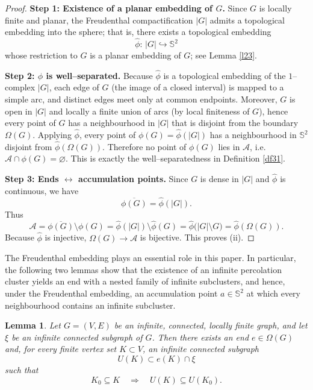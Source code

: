 \documentclass[11pt]{amsart}
\theoremstyle{plain}
\newtheorem{lemma}[theorem]{Lemma}
\numberwithin{equation}{section}
\numberwithin{figure}{section}
\begin{document}
\begin{proof}
\textbf{Step 1: Existence of a planar embedding of $G$.}
Since $G$ is locally finite and planar, the Freudenthal compactification $|G|$ admits a topological
embedding into the sphere; that is, there exists a topological embedding
\[
\widehat\phi:\,|G|\hookrightarrow \mathbb{S}^2
\]
whose restriction to $G$ is a planar embedding of $G$; see Lemma \ref{l23}.


\smallskip
\textbf{Step 2: $\phi$ is well--separated.}
Because $\widehat\phi$ is a topological embedding of the $1$--complex $|G|$, each edge of $G$
(the image of a closed interval) is mapped to a simple arc, and distinct edges meet only at common
endpoints. Moreover, $G$ is open in $|G|$ and locally a finite union of arcs (by local finiteness
of $G$), hence every point of $G$ has a neighbourhood in $|G|$ that is disjoint from the boundary
$\Omega(G)$. Applying $\widehat\phi$, every point of $\phi(G)=\widehat\phi(|G|)$ has a neighbourhood
in $\mathbb{S}^2$ disjoint from $\widehat\phi(\Omega(G))$. Therefore no point of $\phi(G)$ lies in
$\mathcal{A}$, i.e.\ $\mathcal{A}\cap\phi(G)=\varnothing$. This is exactly
the well--separatedness in Definition \ref{df31}.

\smallskip
\textbf{Step 3: Ends $\leftrightarrow$ accumulation points.}
Since $G$ is dense in $|G|$ and $\widehat\phi$ is continuous, we have
\[
\overline{\phi(G)}=\widehat\phi(|G|).
\]
Thus
\[
\mathcal{A}=\overline{\phi(G)}\setminus \phi(G)
=\widehat\phi(|G|)\setminus \widehat\phi(G)
=\widehat\phi\!\big(|G|\setminus G\big)
=\widehat\phi(\Omega(G)).
\]
Because $\widehat\phi$ is injective, $\Omega(G)\to \mathcal{A}$ is bijective. This proves (ii).
\end{proof}

The Freudenthal embedding plays an essential role in this paper. In particular,
the following two lemmas show that the existence of an infinite percolation
cluster yields an end with a nested family of infinite subclusters, and hence,
under the Freudenthal embedding, an accumulation point $a\in\mathbb{S}^2$ at
which every neighbourhood contains an infinite subcluster.


\begin{lemma}\label{lem:end-ray}
Let $G=(V,E)$ be an infinite, connected, locally finite graph, and let $\xi$
be an infinite connected subgraph of $G$. Then there exists an end
$e\in\Omega(G)$ and, for every finite vertex set $K\subset V$, an infinite
connected subgraph
\[
  U(K) \subset e(K)\cap\xi
\]
such that
\[
  K_0 \subseteq K \quad\Longrightarrow\quad U(K) \subseteq U(K_0).
\]
\end{lemma}
\end{document}
